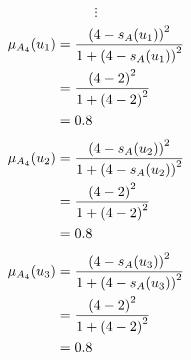\documentclass[a4paper]{book}
\begin{document}
				\[
					\vdots
				\]
				\begin{align}
					\mu_{A_4}(u_1) &= \frac{\left(4-s_A(u_1)\right)^2}{1 + \left(4-s_A(u_1)\right)^2}\\
					&= \frac{\left(4-2\right)^2}{1 + \left(4-2\right)^2} \notag \\
					&= 0.8 \notag
				\end{align}
				\begin{align}
					\mu_{A_4}(u_2) &= \frac{\left(4-s_A(u_2)\right)^2}{1 + \left(4-s_A(u_2)\right)^2}\\
					&= \frac{\left(4-2\right)^2}{1 + \left(4-2\right)^2} \notag \\
					&= 0.8 \notag
				\end{align}
				\begin{align}
					\mu_{A_4}(u_3) &= \frac{\left(4-s_A(u_3)\right)^2}{1 + \left(4-s_A(u_3)\right)^2}\\
					&= \frac{\left(4-2\right)^2}{1 + \left(4-2\right)^2} \notag \\
					&= 0.8 \notag
				\end{align}
\end{document}
